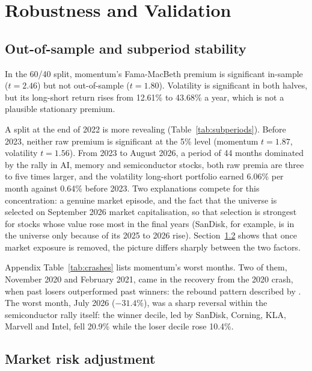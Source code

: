 \documentclass[11pt,a4paper]{article}
\begin{document}
\FloatBarrier
\section{Robustness and Validation}
\label{sec:robust}

\subsection{Out-of-sample and subperiod stability}

In the 60/40 split, momentum's Fama-MacBeth premium is significant in-sample ($t = 2.46$) but not out-of-sample ($t = 1.80$). Volatility is significant in both halves, but its long-short return rises from 12.61\% to 43.68\% a year, which is not a plausible stationary premium.

A split at the end of 2022 is more revealing (Table~\ref{tab:subperiods}). Before 2023, neither raw premium is significant at the 5\% level (momentum $t = 1.87$, volatility $t = 1.56$). From 2023 to August 2026, a period of 44 months dominated by the rally in AI, memory and semiconductor stocks, both raw premia are three to five times larger, and the volatility long-short portfolio earned 6.06\% per month against 0.64\% before 2023. Two explanations compete for this concentration: a genuine market episode, and the fact that the universe is selected on September 2026 market capitalisation, so that selection is strongest for stocks whose value rose most in the final years (SanDisk, for example, is in the universe only because of its 2025 to 2026 rise). Section~\ref{sec:risk} shows that once market exposure is removed, the picture differs sharply between the two factors.

\begin{table}[!htbp]
\centering
\caption{Multivariate Fama-MacBeth premia before and during the 2023 to 2026 rally.}
\label{tab:subperiods}
\small

\end{table}

Appendix Table~\ref{tab:crashes} lists momentum's worst months. Two of them, November 2020 and February 2021, came in the recovery from the 2020 crash, when past losers outperformed past winners: the rebound pattern described by \citet{daniel2016}. The worst month, July 2026 ($-31.4\%$), was a sharp reversal within the semiconductor rally itself: the winner decile, led by SanDisk, Corning, KLA, Marvell and Intel, fell 20.9\% while the loser decile rose 10.4\%.

\subsection{Market risk adjustment}
\label{sec:risk}
\end{document}
